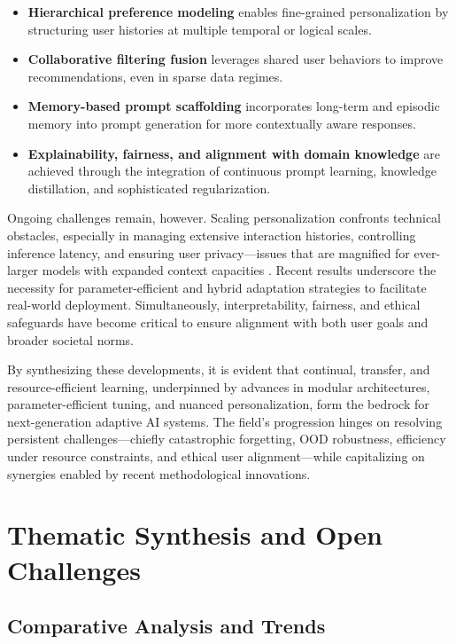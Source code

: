 \documentclass[sigconf]{acmart}
\begin{document}
\begin{itemize}
    \item \textbf{Hierarchical preference modeling} enables fine-grained personalization by structuring user histories at multiple temporal or logical scales.
    \item \textbf{Collaborative filtering fusion} leverages shared user behaviors to improve recommendations, even in sparse data regimes.
    \item \textbf{Memory-based prompt scaffolding} incorporates long-term and episodic memory into prompt generation for more contextually aware responses.
    \item \textbf{Explainability, fairness, and alignment with domain knowledge} are achieved through the integration of continuous prompt learning, knowledge distillation, and sophisticated regularization.
\end{itemize}

Ongoing challenges remain, however. Scaling personalization confronts technical obstacles, especially in managing extensive interaction histories, controlling inference latency, and ensuring user privacy—issues that are magnified for ever-larger models with expanded context capacities \cite{ref5, ref24, ref55}. Recent results underscore the necessity for parameter-efficient and hybrid adaptation strategies to facilitate real-world deployment. Simultaneously, interpretability, fairness, and ethical safeguards have become critical to ensure alignment with both user goals and broader societal norms.

By synthesizing these developments, it is evident that continual, transfer, and resource-efficient learning, underpinned by advances in modular architectures, parameter-efficient tuning, and nuanced personalization, form the bedrock for next-generation adaptive AI systems. The field’s progression hinges on resolving persistent challenges—chiefly catastrophic forgetting, OOD robustness, efficiency under resource constraints, and ethical user alignment—while capitalizing on synergies enabled by recent methodological innovations.

\section{Thematic Synthesis and Open Challenges}

\subsection{Comparative Analysis and Trends}
\end{document}

